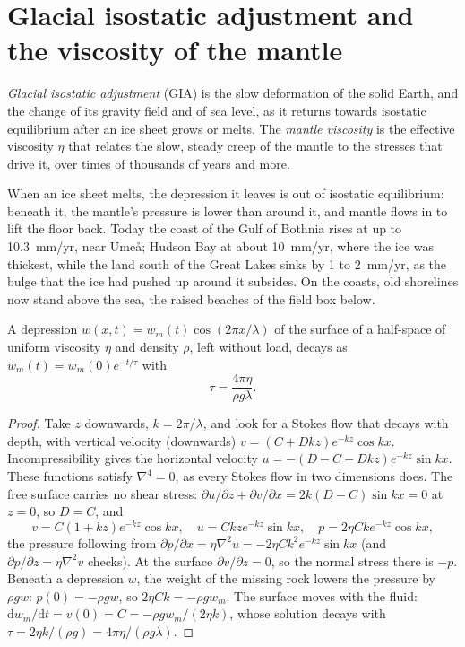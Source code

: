 \section{Glacial isostatic adjustment and the viscosity of the mantle}\label{sec:b3:mantle-convection:gia}

\begin{definition}\label{def:b3:mantle-convection:gia}
\emph{Glacial isostatic adjustment} (GIA)
is the slow deformation of the solid Earth, and the change of its gravity
field and of sea level, as it returns towards isostatic equilibrium after an
ice sheet grows or melts. The \emph{mantle viscosity}
is the effective viscosity $\eta$ that relates the slow, steady creep of the
mantle to the stresses that drive it, over times of thousands of years and more.
\end{definition}

When an ice sheet melts, the depression it leaves is out of isostatic
equilibrium: beneath it, the mantle's pressure is lower than around it, and
mantle flows in to lift the floor back. Today the coast of the Gulf of Bothnia
rises at up to \qty{10.3}{mm/yr}, near Umeå; Hudson Bay at about
\qty{10}{mm/yr}, where the ice was thickest, while the land south of the Great
Lakes sinks by 1 to \qty{2}{mm/yr}, as the bulge that the ice had pushed up
around it subsides. On the coasts, old shorelines now stand above the sea, the
raised beaches of the field box below.

\begin{theorem}\label{thm:b3:mantle-convection:relaxation}
A depression $w(x, t) = w_m(t)\cos(2\pi x/\lambda)$ of the surface of a
half-space of uniform viscosity $\eta$ and density $\rho$, left without load,
decays as $w_m(t) = w_m(0)e^{-t/\tau}$ with
\[
  \tau = \frac{4\pi\eta}{\rho g\lambda} .
\]
\end{theorem}

\begin{proof}
Take $z$ downwards, $k = 2\pi/\lambda$, and look for a Stokes flow that decays
with depth, with vertical velocity (downwards) $v = (C + Dkz)e^{-kz}\cos kx$.
Incompressibility gives the horizontal velocity $u = -(D - C - Dkz)e^{-kz}\sin
kx$. These functions satisfy $\nabla^4 = 0$, as every Stokes flow in two
dimensions does. The free surface carries no shear stress: $\partial u/\partial
z + \partial v/\partial x = 2k(D - C)\sin kx = 0$ at $z = 0$, so $D = C$, and
\[
  v = C(1 + kz)e^{-kz}\cos kx,\quad u = Ckze^{-kz}\sin kx,\quad
  p = 2\eta Cke^{-kz}\cos kx,
\]
the pressure following from $\partial p/\partial x = \eta\nabla^2u = -2\eta
Ck^2e^{-kz}\sin kx$ (and $\partial p/\partial z = \eta\nabla^2v$ checks). At the
surface $\partial v/\partial z = 0$, so the normal stress there is $-p$. Beneath
a depression $w$, the weight of the missing rock lowers the pressure by $\rho
gw$: $p(0) = -\rho gw$, so $2\eta Ck = -\rho gw_m$. The surface moves with the
fluid: $\mathrm dw_m/\mathrm dt = v(0) = C = -\rho gw_m/(2\eta k)$, whose
solution decays with $\tau = 2\eta k/(\rho g) = 4\pi\eta/(\rho g\lambda)$.
\end{proof}


